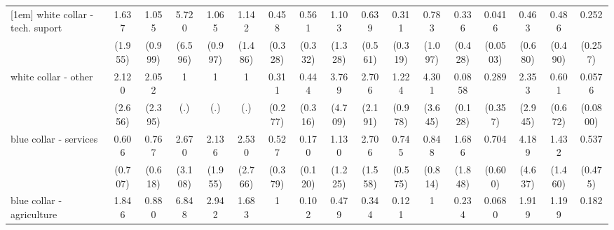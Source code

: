 {\begin{tabular}{l*{16}{c}}
[1em]
white collar - tech. suport&       1.637         &       1.055         &       5.720         &       1.065         &       1.142         &       0.458         &       0.561         &       1.103         &       0.639         &       0.311         &       0.783         &       0.336         &      0.0416\sym{**} &       0.463         &       0.486         &       0.252         \\
                    &     (1.955)         &     (0.999)         &     (6.596)         &     (0.997)         &     (1.486)         &     (0.328)         &     (0.332)         &     (1.328)         &     (0.561)         &     (0.319)         &     (1.097)         &     (0.428)         &    (0.0503)         &     (0.680)         &     (0.490)         &     (0.257)         \\
[1em]
white collar - other&       2.120         &       2.052         &           1         &           1         &           1         &       0.311         &       0.444         &       3.769         &       2.706         &       1.224         &       4.301         &      0.0858         &       0.289         &       2.353         &       0.601         &      0.0576\sym{*}  \\
                    &     (2.656)         &     (2.395)         &         (.)         &         (.)         &         (.)         &     (0.277)         &     (0.316)         &     (4.709)         &     (2.191)         &     (0.978)         &     (3.645)         &     (0.128)         &     (0.357)         &     (2.945)         &     (0.672)         &    (0.0800)         \\
[1em]
blue collar - services&       0.606         &       0.767         &       2.670         &       2.136         &       2.530         &       0.527         &       0.170\sym{*}  &       1.130         &       2.706         &       0.745         &       0.848         &       1.686         &       0.704         &       4.189         &       1.432         &       0.537         \\
                    &     (0.707)         &     (0.618)         &     (3.108)         &     (1.955)         &     (2.766)         &     (0.379)         &     (0.120)         &     (1.225)         &     (1.558)         &     (0.575)         &     (0.814)         &     (1.848)         &     (0.600)         &     (4.637)         &     (1.460)         &     (0.475)         \\
[1em]
blue collar - agriculture&       1.846         &       0.880         &       6.848         &       2.942         &       1.683         &           1         &       0.102\sym{*}  &       0.479         &       0.344         &       0.121         &           1         &       0.234         &      0.0680\sym{*}  &       1.919         &       1.199         &       0.182         \\

\end{tabular}}
